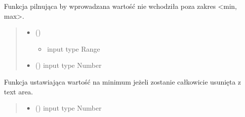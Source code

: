 \documentclass[a4paper,10pt,openany,english]{sphinxmanual}
\begin{document}

\begin{fulllineitems}
\label{\detokenize{js/js-functions:sliderValue}}
\pysigstartsignatures
\pysiglinewithargsret
{}
{\sphinxparamcomma {}}
{}
\pysigstopsignatures
\sphinxAtStartPar
Funkcja pilnująca by wprowadzana wartość nie wchodziła poza zakres \textless{}min, max\textgreater{}.
\begin{quote}\begin{description}
\begin{itemize}
\item {} 
\sphinxAtStartPar
{} () \textendash{} \begin{itemize}
\item {} 
\sphinxAtStartPar
input type Range

\end{itemize}


\item {} 
\sphinxAtStartPar
{} () \textendash{} input type Number

\end{itemize}

\end{description}\end{quote}

\end{fulllineitems}


\begin{fulllineitems}
\label{\detokenize{js/js-functions:restoreDefault}}
\pysigstartsignatures
\pysiglinewithargsret
{}
{}
{}
\pysigstopsignatures
\sphinxAtStartPar
Funkcja ustawiająca wartość na minimum jeżeli zostanie całkowicie usunięta z text area.
\begin{quote}\begin{description}
\begin{itemize}
\item {} 
\sphinxAtStartPar
{} () \textendash{} input type Number

\end{itemize}

\end{description}\end{quote}

\end{fulllineitems}
\end{document}
